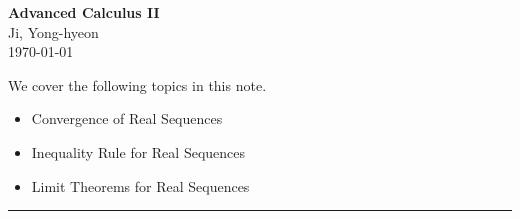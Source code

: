 \documentclass[11pt,openany]{article}
\begin{document}
\begin{center}
	\huge\textbf{Advanced Calculus II}\\
	\vspace{0.5em}
	\large{Ji, Yong-hyeon}\\
	\vspace{0.5em}
	\normalsize{\today}\\
\end{center}

\noindent 
We cover the following topics in this note.
\begin{itemize}
	\item Convergence of Real Sequences
	\item Inequality Rule for Real Sequences
	\item Limit Theorems for Real Sequences
\end{itemize}
\hrule\vspace{12pt}
\end{document}
